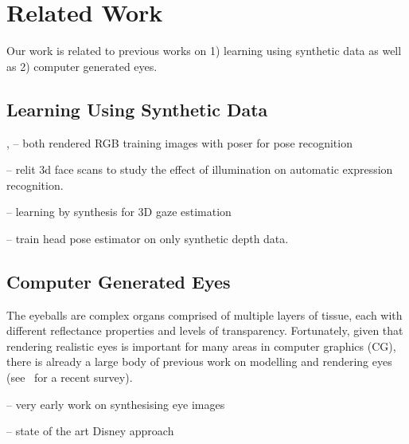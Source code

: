 
\section{Related Work}

Our work is related to previous works on 1) learning using synthetic data as well as 2) computer generated eyes.

\subsection{Learning Using Synthetic Data}

\cite{okada2008relevant}, \cite{shakhnarovich2003fast} -- both rendered RGB training images with poser for pose recognition

\cite{stratou2011effect} -- relit 3d face scans to study the effect of illumination on automatic expression recognition.

\cite{sugano2014learning} -- learning by synthesis for 3D gaze estimation

\cite{lu2012head}

\cite{fanelli2011real} -- train head pose estimator on only synthetic depth data.

\cite{kaneva2011evaluation}
\cite{liebelt2010multiview}
\cite{jaderberg2014synthetic}
\cite{yu2010improving}

\subsection{Computer Generated Eyes}

\cite{ruhland2014look}


The eyeballs are complex organs comprised of multiple layers of tissue, each with different reflectance properties and levels of transparency.
Fortunately, given that rendering realistic eyes is important for many areas in computer graphics (CG), there is already a large body of previous work on modelling and rendering eyes (see~\cite{ruhland2014look} for a recent survey).

\cite{feng1998variance} -- very early work on synthesising eye images

\cite{berard2014highquality} -- state of the art Disney approach


